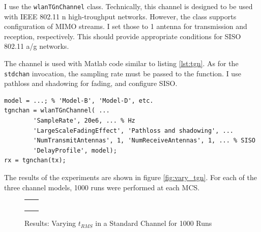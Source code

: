 I use the \texttt{wlanTGnChannel} class. Technically, this channel is designed to be used with IEEE 802.11 n high-troughput networks. However, the class supports configuration of MIMO streams. I set those to 1 antenna for transmission and reception, respectively. This should provide appropriate conditions for SISO 802.11 a/g networks.

The channel is used with Matlab code similar to listing \ref{lst:tgn}. As for the \texttt{stdchan} invocation, the sampling rate must be passed to the function. I use pathloss and shadowing for fading, and configure SISO.

\begin{lstlisting}[captionpos=b,caption={Matlab wlanTGnChannel Simulation},label=lst:tgn]
model = ...; % 'Model-B', 'Model-D', etc.
tgnchan = wlanTGnChannel( ...
        'SampleRate', 20e6, ... % Hz
        'LargeScaleFadingEffect', 'Pathloss and shadowing', ...
        'NumTransmitAntennas', 1, 'NumReceiveAntennas', 1, ... % SISO
        'DelayProfile', model);
rx = tgnchan(tx);
\end{lstlisting}

The results of the experiments are shown in figure \ref{fig:vary_tgn}. For each of the three channel models, 1000 runs were performed at each \gls{MCS}.

\begin{figure}[p]
	\centering
	\setlength\figureheight{3cm}
	\setlength{}
	\begin{tabular}{cc}
		\subfloat[MCS 0]{} &
		\subfloat[MCS 1]{} \\
		\subfloat[MCS 2]{} &
		\subfloat[MCS 3]{} \\
		\subfloat[MCS 4]{} &
		\subfloat[MCS 5]{} \\
		\subfloat[MCS 6]{} &
		\subfloat[MCS 7]{} \\
	\end{tabular}
	\caption{Results: Varying $t_{RMS}$ in a Standard Channel for 1000 Runs}
	\label{fig:vary_trms}
\end{figure}

